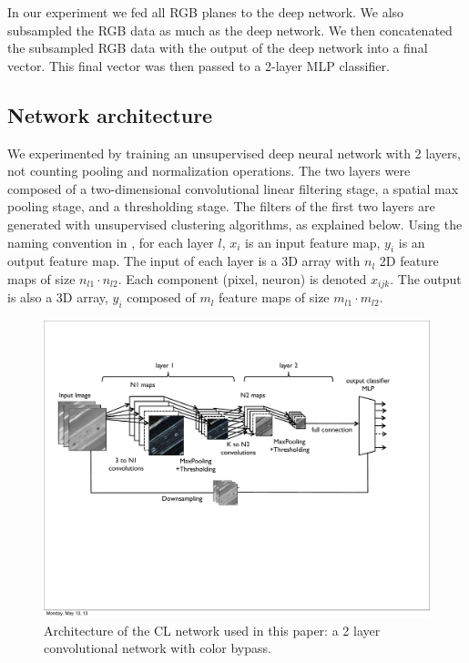 \documentclass{article} %
\begin{document}
In our experiment we fed all RGB planes to the deep network. We also subsampled the RGB data as much as the deep network. We then concatenated the subsampled RGB data with the output of the deep network into a final vector. This final vector was then passed to a 2-layer MLP classifier. 

\subsection{Network architecture}
\label{sec-net-arch}

We experimented by training an unsupervised deep neural network with 2 layers, not counting pooling and normalization operations. The two layers were composed of a two-dimensional convolutional linear filtering stage, a spatial max pooling stage, and a thresholding stage. 
The filters of the first two layers are generated with unsupervised clustering algorithms, as explained below. 
Using the naming convention in \cite{lecun_convolutional_2010}, for each layer $l$,  $x_i$ is an input feature map, $y_i$ is an output feature map. The input of each layer is a 3D array with $n_l$ 2D feature maps of size $n_{l1} \cdot n_{l2}$. Each component (pixel, neuron) is denoted $x_{ijk}$. The output is also a 3D array, $y_i$ composed of $m_l$ feature maps of size $m_{l1} \cdot m_{l2}$.


\begin{figure}
\includegraphics[width=5in]{fig-netarch.pdf}
\caption{Architecture of the CL network used in this paper: a 2 layer convolutional network with color bypass.}
\label{fig-netarch}
\end{figure}
\end{document}
